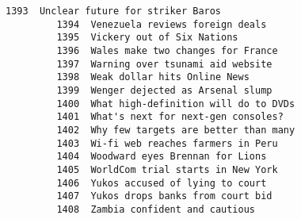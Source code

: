 \documentclass[11pt]{article}
\begin{document}
\begin{Verbatim}[commandchars=\\\{\}]
         1393  Unclear future for striker Baros                                                            
         1394  Venezuela reviews foreign deals                                                             
         1395  Vickery out of Six Nations                                                                  
         1396  Wales make two changes for France                                                           
         1397  Warning over tsunami aid website                                                            
         1398  Weak dollar hits Online News                                                                
         1399  Wenger dejected as Arsenal slump                                                            
         1400  What high-definition will do to DVDs                                                        
         1401  What's next for next-gen consoles?                                                          
         1402  Why few targets are better than many                                                        
         1403  Wi-fi web reaches farmers in Peru                                                           
         1404  Woodward eyes Brennan for Lions                                                             
         1405  WorldCom trial starts in New York                                                           
         1406  Yukos accused of lying to court                                                             
         1407  Yukos drops banks from court bid                                                            
         1408  Zambia confident and cautious                                                               
         

\end{Verbatim}
\end{document}
